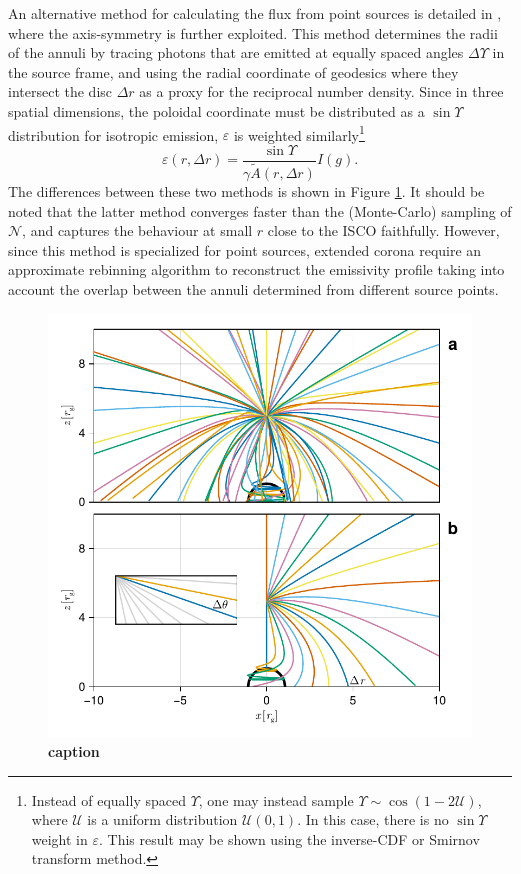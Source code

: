 \documentclass[fleqn,usenatbib]{mnras}
\newcommand{\todo}[1]{{\bf \color{red} #1}}
\begin{document}
An alternative method for calculating the flux from point sources is detailed in \cite{dauser_irradiation_2013}, where the axis-symmetry is further exploited. This method determines the radii of the annuli by tracing photons that are emitted at equally spaced angles $\Delta \Upsilon$ in the source frame, and using the radial coordinate of geodesics where they intersect the disc $\Delta r$ as a proxy for the reciprocal number density. Since in three spatial dimensions, the poloidal coordinate must be distributed as a $\sin \Upsilon$ distribution for isotropic emission, $\varepsilon$ is weighted similarly\footnote{Instead of equally spaced $\Upsilon$, one may instead sample $\Upsilon \sim \cos (1 - 2 \mathcal{U})$, where $\mathcal{U}$ is a uniform distribution $\mathcal{U}(0,1)$. In this case, there is no $\sin \Upsilon$ weight in $\varepsilon$. This result may be shown using the inverse-CDF or Smirnov transform method.}
\begin{equation}
    \varepsilon(r, \Delta r) = \frac{\sin \Upsilon}{\gamma \tilde{A}(r, \Delta r)} I(g).
\end{equation}
The differences between these two methods is shown in Figure \ref{fig:coronal-tracing}. It should be noted that the latter method converges faster than the (Monte-Carlo) sampling of $\mathcal{N}$, and captures the behaviour at small $r$ close to the ISCO faithfully. However, since this method is specialized for point sources, extended corona require an approximate rebinning algorithm to reconstruct the emissivity profile taking into account the overlap between the annuli determined from different source points.

\begin{figure}
    \centering
    \includegraphics[width=0.95\linewidth]{figures/emissivity.coronal-traces.pdf}
    \caption{\todo{caption}}
    \label{fig:coronal-tracing}
\end{figure}
\end{document}
